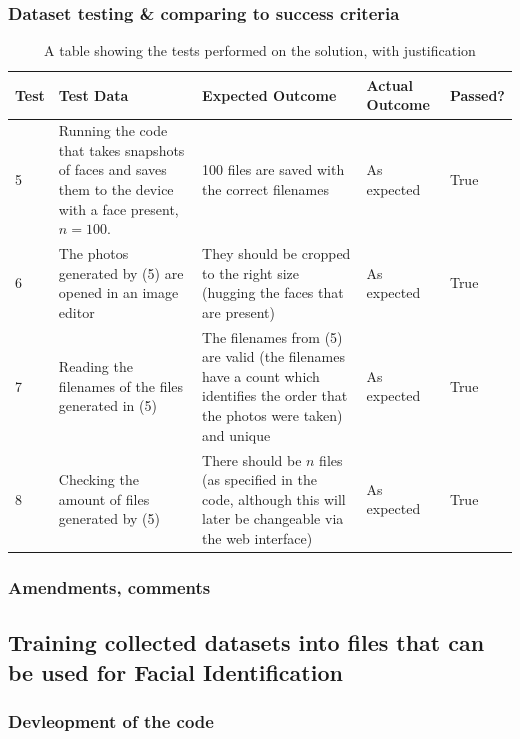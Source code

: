 \documentclass[9pt]{article}
\begin{document}
\subsubsection{Dataset testing \& comparing to success criteria}
\begin{table}[H]
	\centering
	\begin{tabularx}{\textwidth}{lXXXl}
		\textbf{Test} & \textbf{Test Data} & \textbf{Expected Outcome} & \textbf{Actual Outcome} & \textbf{Passed?} \\
		\midrule
	5            &    Running the code that takes snapshots of faces and saves them to the device with a face present, $n=100$.               & 100 files are saved with the correct filenames  &  As expected & True  \\
		6             & The photos generated by (5) are opened in an image editor & They should be cropped to the right size (hugging the faces that are present)  & As expected & True  \\
		7             &  Reading the filenames of the files generated in (5)& The filenames from (5) are valid (the filenames have a count which identifies the order that the photos were taken) and unique & As expected & True \\
		8             &  Checking the amount of files generated by (5)  & There should be $n$ files (as specified in the code, although this will later be changeable via the web interface) & As expected  & True \\
		\bottomrule
	\end{tabularx}
	\caption{A table showing the tests performed on the solution, with justification}
	\label{tab_testingDesignSolution}
\end{table}




\subsubsection{Amendments, comments}




\newpage
\subsection{Training collected datasets into files that can be used for Facial Identification}
\subsubsection{Devleopment of the code}
\end{document}
